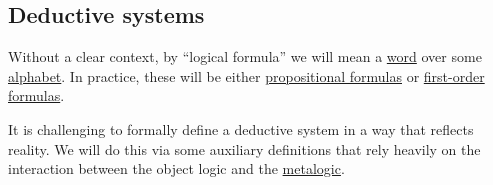 \subsection{Deductive systems}\label{subsec:deductive_systems}

Without a clear context, by \enquote{logical formula} we will mean a \hyperref[def:formal_language/word]{word} over some \hyperref[def:formal_language]{alphabet}. In practice, these will be either \hyperref[def:propositional_syntax/formula]{propositional formulas} or \hyperref[def:first_order_syntax/formula]{first-order formulas}.

It is challenging to formally define a deductive system in a way that reflects reality. We will do this via some auxiliary definitions that rely heavily on the interaction between the object logic and the \hyperref[rem:metalogic]{metalogic}.

